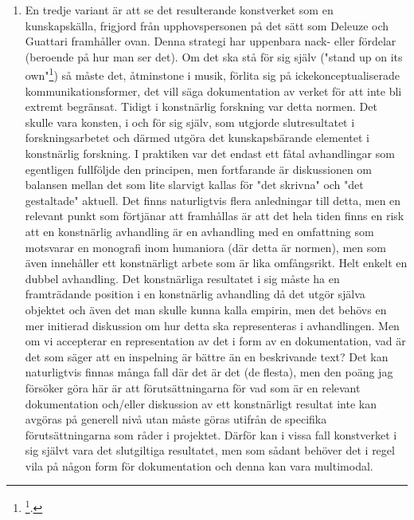 \documentclass[11pt]{article}
\begin{document}
\begin{enumerate}
\item En tredje variant är att se det resulterande konstverket som en
kunskapskälla, frigjord från upphovspersonen på det sätt som Deleuze
och Guattari framhåller ovan. Denna strategi har uppenbara nack-
eller fördelar (beroende på hur man ser det). Om det ska stå för sig
själv ("stand up on its own"\footnote{\footcite{deleuze1994}.}) så måste det, åtminstone i
musik, förlita sig på ickekonceptualiserade kommunikationsformer, det
vill säga dokumentation av verket för att inte bli extremt begränsat.
Tidigt i konstnärlig forskning var detta normen. Det skulle vara
konsten, i och för sig själv, som utgjorde slutresultatet i
forskningsarbetet och därmed utgöra det kunskapsbärande elementet i
konstnärlig forskning. I praktiken var det endast ett fåtal
avhandlingar som egentligen fullföljde den principen, men fortfarande
är diskussionen om balansen mellan det som lite slarvigt kallas för
"det skrivna" och "det gestaltade" aktuell. Det finns naturligtvis
flera anledningar till detta, men en relevant punkt som förtjänar att
framhållas är att det hela tiden finns en risk att en konstnärlig
avhandling är en avhandling med en omfattning som motsvarar en
monografi inom humaniora (där detta är normen), men som även
innehåller ett konstnärligt arbete som är lika omfångsrikt. Helt
enkelt en dubbel avhandling. Det konstnärliga resultatet i sig måste
ha en framträdande position i en konstnärlig avhandling då det utgör
själva objektet och även det man skulle kunna kalla empirin, men det
behövs en mer initierad diskussion om hur detta ska representeras i
avhandlingen. Men om vi accepterar en representation av det i form av
en dokumentation, vad är det som säger att en inspelning är bättre än
en beskrivande text? Det kan naturligtvis finnas många fall där det
är det (de flesta), men den poäng jag försöker göra här är att
förutsättningarna för vad som är en relevant dokumentation och/eller
diskussion av ett konstnärligt resultat inte kan avgöras på generell
nivå utan måste göras utifrån de specifika förutsättningarna som
råder i projektet. Därför kan i vissa fall konstverket i sig självt
vara det slutgiltiga resultatet, men som sådant behöver det i regel
vila på någon form för dokumentation och denna kan vara multimodal.
\end{enumerate}
\end{document}
